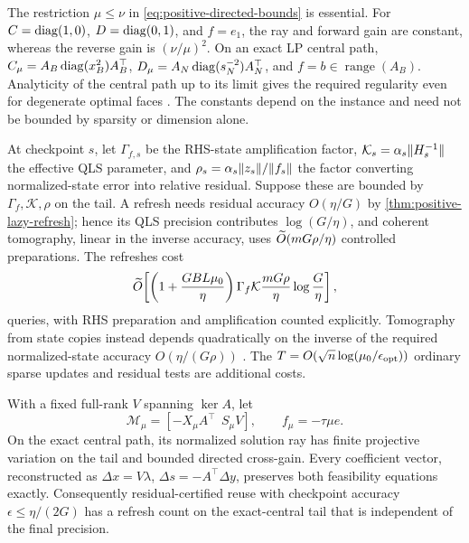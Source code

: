 The restriction $\mu\leq\nu$ in \eqref{eq:positive-directed-bounds} is
essential.  For
$C=\operatorname{diag}(1,0)$, $D=\operatorname{diag}(0,1)$, and $f=e_1$, the ray and forward gain are
constant, whereas the reverse gain is $(\nu/\mu)^2$.  On an exact LP central
path, $C_\mu=A_B\operatorname{diag}(x_B^2)A_B^\top$, $D_\mu=A_N\operatorname{diag}(s_N^{-2})A_N^\top$, and
$f=b\in\operatorname{range}(A_B)$.  Analyticity of the central path up to
its limit gives the required regularity even for degenerate optimal faces
\cite{halicka1999-analytical-properties-central-path-linear-programming,
positive-monteiro1996-limiting-derivatives}.  The constants depend on the
instance and need not be bounded by sparsity or dimension alone.

At checkpoint $s$, let $\Gamma_{f,s}$ be the RHS-state amplification factor,
$\mathcal K_s=\alpha_s\lVert H_s^{-1}\rVert$ the effective QLS parameter, and
$\rho_s=\alpha_s\lVert z_s\rVert/\lVert f_s\rVert$ the factor converting normalized-state
error into relative residual.  Suppose these are bounded by
$\Gamma_f,\mathcal K,\rho$ on the tail.  A refresh needs residual accuracy
$O(\eta/G)$ by \cref{thm:positive-lazy-refresh}; hence its QLS
precision contributes $\log(G/\eta)$, and coherent tomography, linear in the
inverse accuracy, uses
$\widetilde{O}(mG\rho/\eta)$ controlled preparations.  The refreshes cost
\begin{equation}
 \widetilde{O}\!\left[
 \left(1+\frac{GBL\mu_0}{\eta}\right)
 \Gamma_f\mathcal K\frac{mG\rho}{\eta}
 \log\frac{G}{\eta}\right],                           \label{eq:positive-lazy-quantum-ledger}
\end{equation}
queries, with RHS preparation and amplification counted explicitly.
Tomography from state copies instead depends quadratically on the inverse of
the required normalized-state accuracy $O(\eta/(G\rho))$
\cite{joran2023-quantum-tomography-state-preparation-unitaries}.  The
$T=O(\sqrt n\log(\mu_0/\epsilon_{\rm opt}))$ ordinary sparse updates and
residual tests are additional costs.

\begin{corollary}
\label{cor:positive-exact-oss}
With a fixed full-rank $V$ spanning $\ker A$, let
\begin{equation}
 \mathcal M_\mu=[-X_\mu A^\top\ \ S_\mu V],\qquad
 f_\mu=-\tau\mu e.                                     \label{eq:positive-oss}
\end{equation}
On the exact central path, its normalized solution ray has finite projective
variation on the tail and bounded directed cross-gain.  Every coefficient
vector, reconstructed as $\Delta x=V\lambda$, $\Delta s=-A^\top\Delta y$,
preserves both feasibility equations exactly.  Consequently residual-certified
reuse with checkpoint accuracy $\epsilon\leq\eta/(2G)$ has a refresh count on
the exact-central tail that is independent of the final precision.
\end{corollary}

